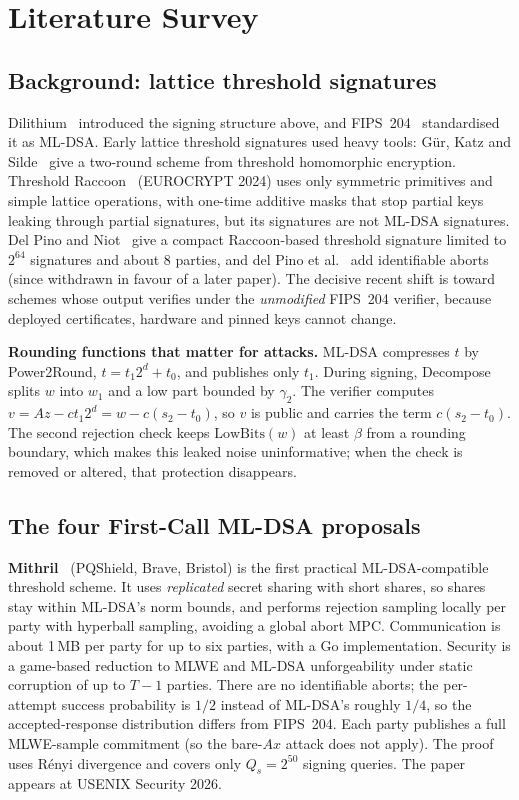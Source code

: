 \documentclass[10pt,conference,a4paper]{IEEEtran}
\newcommand{\LB}{\mathrm{LowBits}}
\begin{document}
\section{Literature Survey}

\subsection{Background: lattice threshold signatures}
Dilithium~\cite{dilithium} introduced the signing structure above, and FIPS~204~\cite{fips204} standardised it as ML-DSA.
Early lattice threshold signatures used heavy tools: G\"ur, Katz and Silde~\cite{gks} give a two-round scheme from
threshold homomorphic encryption. Threshold Raccoon~\cite{raccoon} (EUROCRYPT 2024) uses only symmetric primitives and
simple lattice operations, with one-time additive masks that stop partial keys leaking through partial signatures, but
its signatures are not ML-DSA signatures. Del Pino and Niot~\cite{finally} give a compact Raccoon-based threshold
signature limited to $2^{64}$ signatures and about 8 parties, and del Pino et al.~\cite{dpia} add identifiable aborts
(since withdrawn in favour of a later paper). The decisive recent shift is toward schemes whose output verifies under the
\emph{unmodified} FIPS~204 verifier, because deployed certificates, hardware and pinned keys cannot change.

\textbf{Rounding functions that matter for attacks.} ML-DSA compresses $t$ by Power2Round, $t=t_1 2^d+t_0$, and publishes
only $t_1$. During signing, Decompose splits $w$ into $w_1$ and a low part bounded by $\gamma_2$. The verifier computes
$v=Az-ct_1 2^d=w-c(s_2-t_0)$, so $v$ is public and carries the term $c(s_2-t_0)$. The second rejection check keeps
$\LB(w)$ at least $\beta$ from a rounding boundary, which makes this leaked noise uninformative; when the check is removed
or altered, that protection disappears.

\subsection{The four First-Call ML-DSA proposals}

\textbf{Mithril}~\cite{mithril,reloaded,mithrilposter,mithrilpw} (PQShield, Brave, Bristol) is the first practical
ML-DSA-compatible threshold scheme. It uses \emph{replicated} secret sharing with short shares, so shares stay within
ML-DSA's norm bounds, and performs rejection sampling locally per party with hyperball sampling, avoiding a global abort
MPC. Communication is about 1\,MB per party for up to six parties, with a Go implementation. Security is a game-based
reduction to MLWE and ML-DSA unforgeability under static corruption of up to $T-1$ parties. There are no identifiable
aborts; the per-attempt success probability is $1/2$ instead of ML-DSA's roughly $1/4$, so the accepted-response
distribution differs from FIPS~204. Each party publishes a full MLWE-sample commitment (so the bare-$Ax$ attack does not
apply). The proof uses R\'enyi divergence and covers only $Q_s=2^{50}$ signing queries. The paper appears at USENIX
Security 2026.
\end{document}
